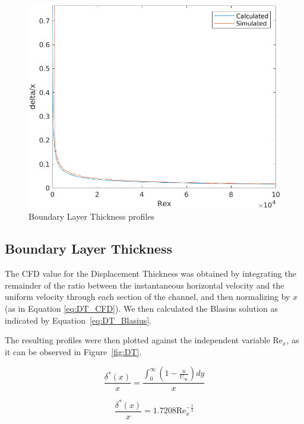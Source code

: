 \documentclass[12pt]{article}
\begin{document}
                \begin{figure}[ht!]
                        \centering
                        \includegraphics[width=\textwidth]{thickness.png}
                        \caption{Boundary Layer Thickness profiles}
                        \label{fig:thickness}
                \end{figure}

        \subsection{Boundary Layer Thickness}

                The CFD value for the Displacement Thickness was obtained by integrating the remainder of the ratio between the instantaneous horizontal velocity and the uniform velocity through each section of the channel, and then normalizing by $ x $ (as in Equation \ref{eq:DT_CFD}). We then calculated the Blasius solution as indicated by Equation~\ref{eq:DT_Blasius}.

                The resulting profiles were then plotted against the independent variable $ \text{Re}_x $, as it can be observed in Figure~\ref{fig:DT}.

                \begin{equation} \label{eq:DT_CFD}
                        \frac{\delta^*(x)}{x} = \frac{\int_0^\infty (1 - \frac{u}{U_\infty}) dy}{x}
                \end{equation}

                \begin{equation} \label{eq:DT_Blasius}
                        \frac{\delta^*(x)}{x} = 1.7208 \text{Re}_x^{-\frac{1}{2}}
                \end{equation}
\end{document}
